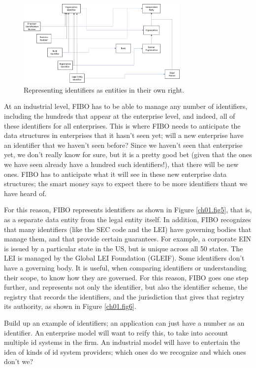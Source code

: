 \begin{figure}[hbt] %
\centering
  \includegraphics[width=3.3in]{figures/id-entity.jpg}
\caption{Representing identifiers as entities in their own right.  }
\label{ch01.fig4} 
\end{figure}

At an industrial level, FIBO has to be able to manage any number of identifiers, including the hundreds that appear at the enterprise level, and indeed, all of these identifiers for all enterprises.  This is where FIBO needs to anticipate the data structures in enterprises that it hasn't seen yet; will a new enterprise have an identifier that we haven't seen before?  Since we haven't seen that enterprise yet, we don't really know for sure, but it is a pretty good bet (given that the ones we have seen already have a hundred such identifiers!), that there will be new ones.  FIBO has to anticipate what it will see in these new enterprise data structures; the smart money says to expect there to be more identifiers thant we have heard of. 

For this reason, FIBO represents identifiers as shown in Figure \ref{ch01.fig5}, that is, as a separate data entity from the legal entity itself.  In addition, FIBO recognizes that many identifiers (like the SEC code and the LEI) have governing bodies that manage them, and that provide certain guarantees.  For example, a corporate EIN is issued by a particular state in the US, but is unique across all 50 states.  The LEI is managed by the Global LEI Foundation (GLEIF).  Some identifiers don't have a governing body.  It is useful, when comparing identifiers or understanding their scope, to know how they are governed.  For this reason, FIBO goes one step further, and represents not only the identifier, but also the identifier scheme, the registry that records the identifiers, and the jurisdiction that gives that registry its authority, as shown in Figure \ref{ch01.fig6}.






Build up an example of identifiers; an application can just have a number as an identifier.  An enterprise model will want to reify this, to take into account multiple id systems in the firm.  An industrial model will have to entertain the idea of kinds of id system providers; which ones do we recognize and which ones don't we? 




